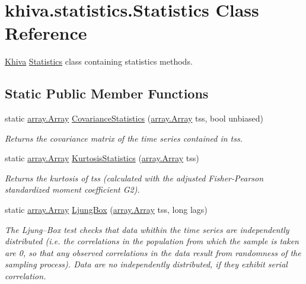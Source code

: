 \hypertarget{classkhiva_1_1statistics_1_1_statistics}{}\section{khiva.\+statistics.\+Statistics Class Reference}
\label{classkhiva_1_1statistics_1_1_statistics}


\mbox{\hyperlink{classkhiva_1_1_khiva}{Khiva}} \mbox{\hyperlink{classkhiva_1_1statistics_1_1_statistics}{Statistics}} class containing statistics methods.  


\subsection*{Static Public Member Functions}
\begin{DoxyCompactItemize}
\item 
static \mbox{\hyperlink{classkhiva_1_1array_1_1_array}{array.\+Array}} \mbox{\hyperlink{classkhiva_1_1statistics_1_1_statistics_ab05455d82ea2d082ac4bc80810fce5fa}{Covariance\+Statistics}} (\mbox{\hyperlink{classkhiva_1_1array_1_1_array}{array.\+Array}} tss, bool unbiased)
\begin{DoxyCompactList}\small\item\em Returns the covariance matrix of the time series contained in tss. \end{DoxyCompactList}\item 
static \mbox{\hyperlink{classkhiva_1_1array_1_1_array}{array.\+Array}} \mbox{\hyperlink{classkhiva_1_1statistics_1_1_statistics_ab96b6c235e6ea20c702067c28473802b}{Kurtosis\+Statistics}} (\mbox{\hyperlink{classkhiva_1_1array_1_1_array}{array.\+Array}} tss)
\begin{DoxyCompactList}\small\item\em Returns the kurtosis of tss (calculated with the adjusted Fisher-\/\+Pearson standardized moment coefficient G2). \end{DoxyCompactList}\item 
static \mbox{\hyperlink{classkhiva_1_1array_1_1_array}{array.\+Array}} \mbox{\hyperlink{classkhiva_1_1statistics_1_1_statistics_a1ac4be386c872cf4db7119e62bac0e32}{Ljung\+Box}} (\mbox{\hyperlink{classkhiva_1_1array_1_1_array}{array.\+Array}} tss, long lags)
\begin{DoxyCompactList}\small\item\em The Ljung–\+Box test checks that data whithin the time series are independently distributed (i.\+e. the correlations in the population from which the sample is taken are 0, so that any observed correlations in the data result from randomness of the sampling process). Data are no independently distributed, if they exhibit serial correlation. \end{DoxyCompactList}\item 

\end{DoxyCompactItemize}
